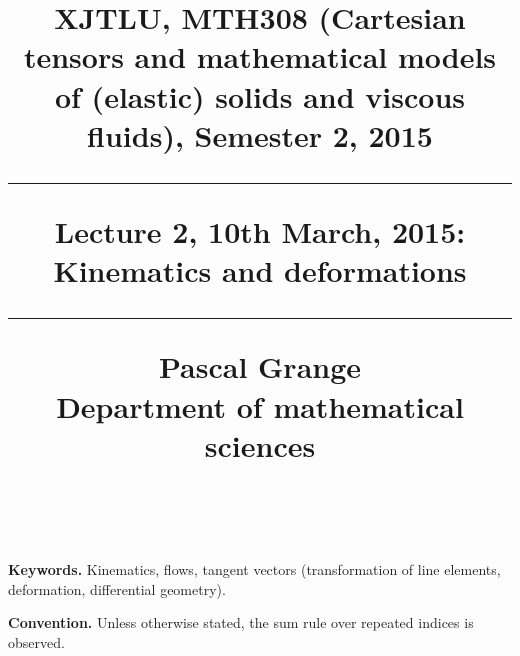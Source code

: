 \documentclass[DIV=12]{article}
\begin{document}


\title{
\noindent\hrulefill
\begin{flushleft}
{\Large \bf{XJTLU, MTH308 (Cartesian tensors and mathematical models of (elastic) solids and viscous fluids), Semester 2, 2015\\
\vspace{8mm}
\hrule
\vspace{6mm}
 Lecture 2, 10th March, 2015: Kinematics and deformations}}
\vspace{8mm}
\hrule
\vspace{6mm}
{\Large{Pascal Grange\\
Department of mathematical sciences\\
{}\\
}}
\noindent\hrulefill
\end{flushleft}}
\date{}
\author{}
\maketitle
\vspace{-3mm}

{\bf{Keywords.}} Kinematics, flows, tangent vectors (transformation of line elements, deformation, differential geometry).\\

\vspace{3mm}

{\bf{Convention.}} Unless otherwise stated, the sum rule over repeated indices is observed.\\


\tableofcontents
\end{document}
